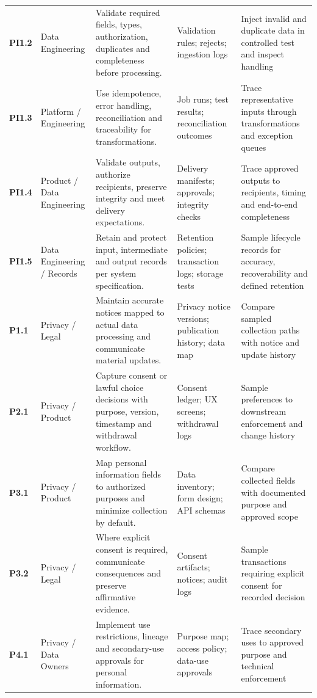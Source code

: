 \documentclass[10pt,oneside]{report}
\begin{document}
\begin{landscape}
\begin{longtable}{@{}>{\raggedright\arraybackslash}p{0.6in}>{\raggedright\arraybackslash}p{1.0in}>{\raggedright\arraybackslash}p{2.5in}>{\raggedright\arraybackslash}p{2.35in}>{\raggedright\arraybackslash}p{2.20in}@{}}
\addlinespace[5pt]
\textbf{PI1.2} & Data Engineering & Validate required fields, types, authorization, duplicates and completeness before processing. & Validation rules; rejects; ingestion logs & Inject invalid and duplicate data in controlled test and inspect handling \\
\addlinespace[5pt]
\textbf{PI1.3} & Platform / Engineering & Use idempotence, error handling, reconciliation and traceability for transformations. & Job runs; test results; reconciliation outcomes & Trace representative inputs through transformations and exception queues \\
\addlinespace[5pt]
\textbf{PI1.4} & Product / Data Engineering & Validate outputs, authorize recipients, preserve integrity and meet delivery expectations. & Delivery manifests; approvals; integrity checks & Trace approved outputs to recipients, timing and end-to-end completeness \\
\addlinespace[5pt]
\textbf{PI1.5} & Data Engineering / Records & Retain and protect input, intermediate and output records per system specification. & Retention policies; transaction logs; storage tests & Sample lifecycle records for accuracy, recoverability and defined retention \\
\addlinespace[5pt]
\textbf{P1.1} & Privacy / Legal & Maintain accurate notices mapped to actual data processing and communicate material updates. & Privacy notice versions; publication history; data map & Compare sampled collection paths with notice and update history \\
\addlinespace[5pt]
\textbf{P2.1} & Privacy / Product & Capture consent or lawful choice decisions with purpose, version, timestamp and withdrawal workflow. & Consent ledger; UX screens; withdrawal logs & Sample preferences to downstream enforcement and change history \\
\addlinespace[5pt]
\textbf{P3.1} & Privacy / Product & Map personal information fields to authorized purposes and minimize collection by default. & Data inventory; form design; API schemas & Compare collected fields with documented purpose and approved scope \\
\addlinespace[5pt]
\textbf{P3.2} & Privacy / Legal & Where explicit consent is required, communicate consequences and preserve affirmative evidence. & Consent artifacts; notices; audit logs & Sample transactions requiring explicit consent for recorded decision \\
\addlinespace[5pt]
\textbf{P4.1} & Privacy / Data Owners & Implement use restrictions, lineage and secondary-use approvals for personal information. & Purpose map; access policy; data-use approvals & Trace secondary uses to approved purpose and technical enforcement \\

\end{longtable}
\end{landscape}
\end{document}
